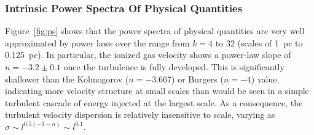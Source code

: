 \documentclass[useAMS,usenatbib]{mn2e}
\newcounter{ionstage}
\newcommand{\ion}[2]{\setcounter{ionstage}{#2}%
  \ensuremath{\mathrm{#1\,\scriptstyle\Roman{ionstage}}}}
\newcommand\hii{\ion{H}{2}}
\begin{document}
\subsubsection{Intrinsic Power Spectra Of Physical Quantities}
\label{sssec:ips}
Figure~\ref{fig:ps} shows that
the power spectra of physical quantities are very well approximated
by power laws over the range from $k = 4$ to 32
(scales of 1~pc to 0.125~pc).
In particular, the ionized gas velocity shows
a power-law slope of \(n = -3.2 \pm 0.1\)
once the turbulence is fully developed. 
This is significantly shallower than the Kolmogorov (\(n = -3.667\))
or Burgers (\(n = -4\)) value,
indicating more velocity structure at small scales than would be seen
in a simple turbulent cascade of energy injected at the largest scale.
As a consequence,
the turbulent velocity dispersion is relatively insensitive to scale,
varying as \(\sigma \sim l^{0.5 (-3 - n)} \sim l^{0.1}\). 

\end{document}
